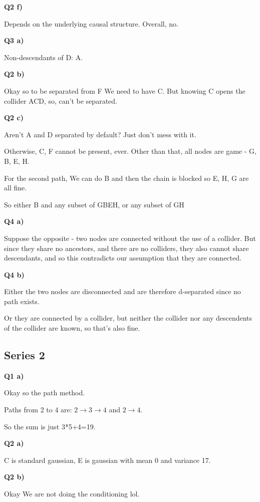 \documentclass{article}
\begin{document}
		\textbf{Q2 f)}
		
			Depends on the underlying causal structure. Overall, no. 
			
		\textbf{Q3 a)}
			
			Non-descendants of D: A.
			
		\textbf{Q2 b)}

			Okay so to be separated from F We need to have C.  But knowing C opens the collider ACD, so, can't be separated.
			
		\textbf{Q2 c)}
				
			Aren't A and D separated by default?  Just don't mess with it.
			
			Otherwise, C, F cannot be present, ever. Other than that, all nodes are game - G, B, E, H.
			
			For the second  path, We can do B and then the chain is blocked so E, H, G are all fine.
			
			So either B and any subset of GBEH, or any subset of GH
			
		\textbf{Q4 a)}
		
			Suppose the opposite - two nodes are connected without the use of a collider. But since they share no ancestors, and there are no colliders, they also cannot share descendants, and so this contradicts our assumption that they are connected.
			
		\textbf{Q4 b)}
		
			Either the two nodes are disconnected and are therefore d-separated since no path exists.
			
			Or they are connected by a collider, but neither the collider nor any descendents of the collider are known, so that's also fine.
			
	\subsection{Series 2}
	
		\textbf{Q1 a)}
		
			Okay so the path method.
			
			Paths from 2 to 4 are: $2\to3\to4$ and $2\to 4$. 
			
			So the sum is just 3*5+4=19.
			
		\textbf{Q2 a)}
		
			C is standard gaussian, E is gaussian with mean 0 and variance 17.
			
		\textbf{Q2 b)}
		
			Okay We are not doing the conditioning lol.
			
\end{document}
